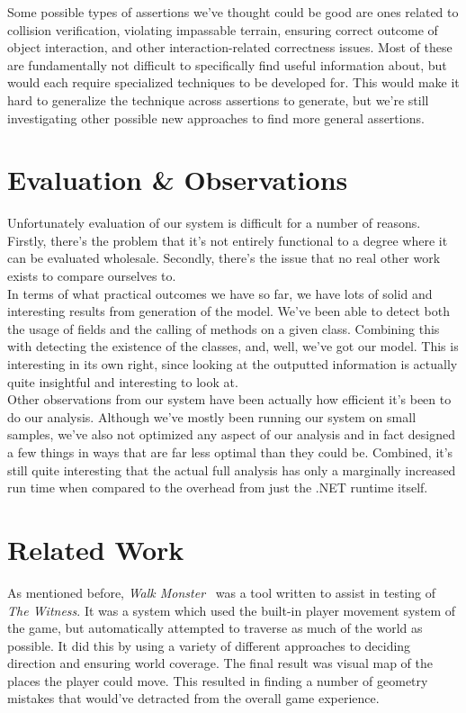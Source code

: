 \documentclass[letterpaper,twocolumn,10pt]{article}
\begin{document}
Some possible types of assertions we've thought could be good are ones related to collision verification, violating impassable terrain, ensuring correct outcome of object interaction, and other interaction-related correctness issues. Most of these are fundamentally not difficult to specifically find useful information about, but would each require specialized techniques to be developed for. This would make it hard to generalize the technique across assertions to generate, but we're still investigating other possible new approaches to find more general assertions. \\

\section{Evaluation \& Observations}

Unfortunately evaluation of our system is difficult for a number of reasons. Firstly, there's the problem that it's not entirely functional to a degree where it can be evaluated wholesale. Secondly, there's the issue that no real other work exists to compare ourselves to. \\

In terms of what practical outcomes we have so far, we have lots of solid and interesting results from generation of the model. We've been able to detect both the usage of fields and the calling of methods on a given class. Combining this with detecting the existence of the classes, and, well, we've got our model. This is interesting in its own right, since looking at the outputted information is actually quite insightful and interesting to look at. \\

Other observations from our system have been actually how efficient it's been to do our analysis. Although we've mostly been running our system on small samples, we've also not optimized any aspect of our analysis and in fact designed a few things in ways that are far less optimal than they could be. Combined, it's still quite interesting that the actual full analysis has only a marginally increased run time when compared to the overhead from just the .NET runtime itself. \\

\section{Related Work}

As mentioned before, \textit{Walk Monster}~\cite{WalkMonster} was a tool written to assist in testing of \textit{The Witness}. It was a system which used the built-in player movement system of the game, but automatically attempted to traverse as much of the world as possible. It did this by using a variety of different approaches to deciding direction and ensuring world coverage. The final result was visual map of the places the player could move. This resulted in finding a number of geometry mistakes that would've detracted from the overall game experience.\\
\end{document}
